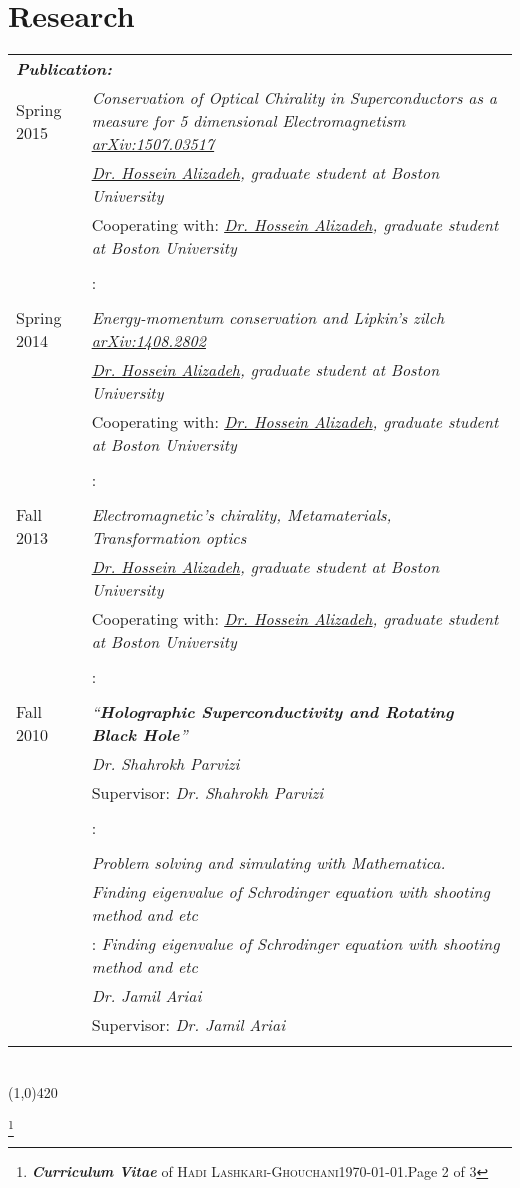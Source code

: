 \documentclass[10pt]{article}
\newcommand{\maxpages}{3}
\newcommand{\maxpages}{3}
\newcommand\HRule{\hspace*{.8cm}\line(1,0){420}\\}
\newenvironment{Record}[1]
{
    \vspace{-0.35cm}
    \section*{#1}
        \vspace{-0.1cm}
        \begin{tabular}
}
{
        \end{tabular}\\
        \HRule
}
\newcommand{\FootNote}[1]{\let\thefootnote\relax\footnote{\textbf{\textit{Curriculum Vitae}} of \textsc{Hadi Lashkari-Ghouchani}\qquad\today.\qquad Page #1 of \maxpages}}
\begin{document}
\newcommand{\Research}[7]{
    \multicolumn{2}{l}{\textbf{\textsl{ #1:}}}\\
    \quad#2&\textit{#3}\\
    \ifthenelse{\isempty{#4}}
    {&\textit{#5}\\}
    {&#4: \textit{#5}\\}
    \ifthenelse{\isempty{#6}}
    {&\textit{#7}\\}
    {&#6: \textit{#7}\\}%
}

\begin{Record}{Research}{l p{11cm}}
    \Research{Publication}
        {Spring 2015}
        {Conservation of Optical Chirality in Superconductors as a measure for 5 dimensional Electromagnetism \href{http://arxiv.org/abs/1507.03517}{arXiv:1507.03517}}
        {Cooperating with}
        {\href{http://physics.bu.edu/people/show/halizade}{Dr. Hossein Alizadeh}, graduate student at Boston University}
        {}{}%
    \Research{Publication}
        {Spring 2014}
        {Energy-momentum conservation and Lipkin’s zilch \href{http://arxiv.org/abs/1408.2802}{arXiv:1408.2802}}
        {Cooperating with}
        {\href{http://physics.bu.edu/people/show/halizade}{Dr. Hossein Alizadeh}, graduate student at Boston University}
        {}{}%
    \Research{Independent Research}
        {Fall 2013}
        {Electromagnetic's chirality, Metamaterials, Transformation optics}
        {Cooperating with}
        {\href{http://physics.bu.edu/people/show/halizade}{Dr. Hossein Alizadeh}, graduate student at Boston University}
        {}{}%
    \Research{M.Sc thesis}
        {Fall 2010}
        {``\textbf{Holographic Superconductivity and Rotating Black Hole}''}
        {Supervisor}
        {Dr. Shahrokh Parvizi}
        {}{}%
    \Research{B.Sc projects}
        {}
        {Problem solving and simulating with Mathematica.}
        {}
        {Finding eigenvalue of Schrodinger equation with shooting method and etc}
        {Supervisor}
        {Dr. Jamil Ariai}%

\end{Record}


\FootNote{2}

\end{document}
